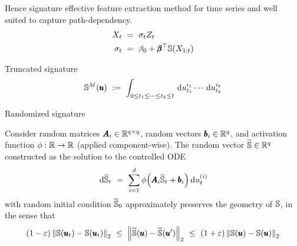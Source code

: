 Hence signature effective feature extraction method for time series and well suited to capture path-dependency.
\begin{align*}
X_t ~ &= ~ \sigma_t Z_t \\
\sigma_t ~ &= ~ \beta_0 + \pmb{\beta}^\top \mathbb{S}(X_{1:t})
\end{align*}

Truncated signature
\begin{equation*}
\mathbb{S}^{M}(\pmb{u}) ~ := ~ \int_{0 \leq t_1 \leq \cdots \leq t_k \leq t} \, \textrm{d} u^{i_1}_{t_1} \cdots \, \textrm{d} u^{i_k}_{t_k}
\end{equation*}

Randomized signature
\begin{theorem}
Consider random matrices $\pmb{A}_i \in \mathbb{R}^{q \times q}$, random vectors $\pmb{b}_i \in \mathbb{R}^q$, and activation function $\phi: \mathbb{R} \to \mathbb{R}$ (applied component-wise). The random vector $\widehat{\mathbb{S}} \in \mathbb{R}^q$ constructed as the solution to the controlled ODE
\begin{equation*}
\, \textrm{d} \widehat{\mathbb{S}}_t ~ = ~ \sum_{i=1}^d \phi \Big( \pmb{A}_i \widehat{\mathbb{S}}_t + \pmb{b}_i \Big) \, \textrm{d} u_t^{(i)}
\end{equation*}
with random initial condition $\widehat{\mathbb{S}}_0$ approximately preserves the geometry of $\mathbb{S}$, in the sense that
\begin{equation*}
(1-\varepsilon) \left\| \mathbb{S}(\pmb{u}_t) - \mathbb{S}(\pmb{u}_t) \right\|_2 ~ \leq ~ \left\| \widetilde{\mathbb{S}}(\pmb{u}) - \widetilde{\mathbb{S}}(\pmb{u}') \right\|_2 ~ \leq ~ (1+\varepsilon) \left\| \mathbb{S}(\pmb{u}) - \mathbb{S}(\pmb{u}) \right\|_2
\end{equation*}
\end{theorem}
